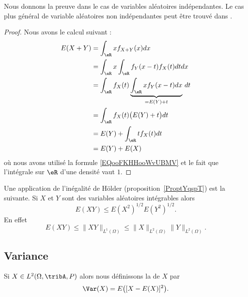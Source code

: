Nous donnons la preuve dans le cas de variables aléatoires indépendantes. Le cas plus général de variable aléatoires non indépendantes peut être trouvé dans \cite{Marazzi}.   %
\begin{proof}
	Nous avons le calcul suivant :
	\begin{subequations}
		\begin{align}
			E(X+Y) & =\int_{\eR}xf_{X+Y}(x)dx                                          \\
			       & =\int_{\eR}x\int_{\eR}f_Y(x-t)f_X(t)dtdx                          \\
			       & =\int_{\eR}f_X(t)\underbrace{\int_{\eR}xf_Y(x-t)dx}_{=E(Y)+t}\,dt \\
			       & =\int_{\eR}f_X(t)\big( E(Y)+t \big)dt                             \\
			       & =E(Y)+\int_{\eR}tf_X(t)dt                                         \\
			       & =E(Y)+E(X)
		\end{align}
	\end{subequations}
	où nous avons utilisé la formule \ref{EQooFKHHooWvUBMV} et le fait que l'intégrale sur \( \eR\) d'une densité vaut \( 1\).
\end{proof}

Une application de l'inégalité de Hölder (proposition~\ref{ProptYqspT}) est la suivante. Si \( X\) et \( Y\) sont des variables aléatoires intégrables alors
\begin{equation}
	E(XY)\leq E(X^2)^{1/2}E(Y^2)^{1/2}.
\end{equation}
En effet
\begin{equation}    \label{EqEXYleqXdYdNormHolder}
	E(XY)\leq \| XY \|_{L^1(\Omega)}\leq \| X \|_{L^2(\Omega)}\| Y \|_{L^2(\Omega)}.
\end{equation}

\subsection{Variance}

Si \( X\in L^2(\Omega,\tribA,P)\) alors nous définissons la  de \( X\) par
\begin{equation}
	\Var(X)=E\big( [X-E(X)]^2 \big).
\end{equation}

